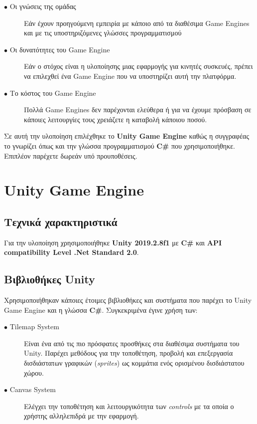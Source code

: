 \begin{description}
\item[$\bullet$ Οι γνώσεις της ομάδας] Εάν έχουν προηγούμενη εμπειρία με κάποιο από τα διαθέσιμα Game Engines και με τις υποστηριζόμενες γλώσσες προγραμματισμού
\item[$\bullet$ Οι δυνατότητες του Game Engine] Εάν ο στόχος είναι η υλοποίησης μιας εφαρμογής για κινητές συσκευές, πρέπει να επιλεχθεί ένα Game Engine που να υποστηρίζει αυτή την πλατφόρμα.
\item[$\bullet$ Το κόστος του Game Engine] Πολλά Game Engines δεν παρέχονται ελεύθερα ή για να έχουμε πρόσβαση σε κάποιες λειτουργίες τους χρειάζετε η καταβολή κάποιου ποσού.
\end{description}

\par
Σε αυτή την υλοποίηση επιλέχθηκε το \textbf{Unity Game Engine} καθώς η συγγραφέας το γνωρίζει όπως και την γλώσσα προγραμματισμού \textbf{C\#} που χρησιμοποιήθηκε. Επιπλέον παρέχετε δωρεάν υπό προυποθέσεις.


\section{Unity Game Engine}

\subsection{Τεχνικά χαρακτηριστικά}
Για την υλοποίηση χρησιμοποιήθηκε \textbf{Unity 2019.2.8f1} με \textbf{C\#} και \textbf{API compatibility Level .Net Standard 2.0}. 

\subsection{Βιβλιοθήκες Unity}
Χρησιμοποιήθηκαν κάποιες έτοιμες βιβλιοθήκες και συστήματα που παρέχει το Unity Game Engine και η γλώσσα \textbf{C\#}. Συγκεκριμένα έγινε χρήση των:

\begin{description}
\item[$\bullet$ Tilemap System] Είναι ένα από τις πιο πρόσφατες προσθήκες στα διαθέσιμα συστήματα του Unity. Παρέχει μεθόδους για την τοποθέτηση, προβολή και επεξεργασία δισδιάστατων γραφικών (\textit{sprites}) ως κομμάτια ενός ορισμένου δισδιάστατου χώρου.
\item[$\bullet$ Canvas System] Ελέγχει την τοποθέτηση και λειτουργικότητα των \textit{controls} με τα οποία ο χρήστης αλληλεπιδρά με την εφαρμογή.
\end{description}


